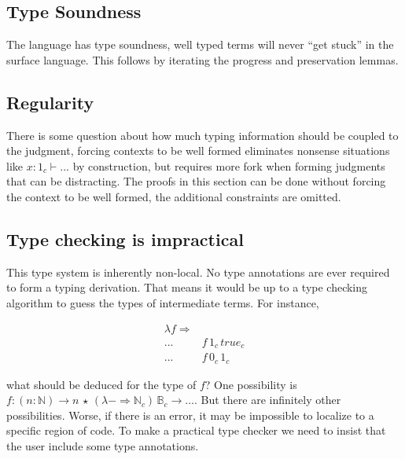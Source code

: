 \subsection{Type Soundness}

The language has type soundness, well typed terms will never ``get stuck'' in the surface language.
This follows by iterating the progress and preservation lemmas.




\subsection{Regularity}
There is some question about how much typing information should be coupled to the judgment, forcing contexts to be well formed eliminates nonsense situations like $x:1_{c}\vdash...$ by construction, but requires more fork when forming judgments that can be distracting.
The proofs in this section can be done without forcing the context to be well formed, the additional constraints are omitted.

\subsection{Type checking is impractical}

This type system is inherently non-local.
No type annotations are ever required to form a typing derivation.
That means it would be up to a type checking algorithm to guess the types of intermediate terms.
For instance, 

\begin{align*}
\lambda f\Rightarrow & \,\\
... & f\,1_{c}\,true_{c}\\
... & f\,0_{c}\,1_{c}
\end{align*}
  
what should be deduced for the type of $f$? One possibility is $f:\left(n:\mathbb{N}\right)\rightarrow n\,\star\,\left(\lambda-\Rightarrow\mathbb{N}_{c}\right)\,\mathbb{B}_{c}\rightarrow...$.
But there are infinitely other possibilities.
Worse, if there is an error, it may be impossible to localize to a specific region of code.
To make a practical type checker we need to insist that the user include some type annotations.

